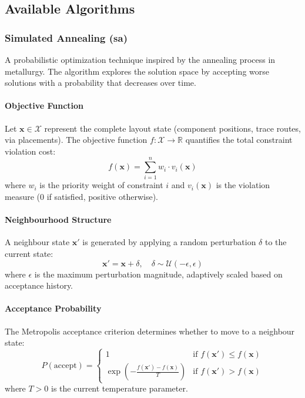 \subsection{Available Algorithms}

\subsubsection{Simulated Annealing (sa)}
A probabilistic optimization technique inspired by the annealing process in metallurgy. The algorithm explores the solution space by accepting worse solutions with a probability that decreases over time.

\paragraph{Objective Function}
Let $\mathbf{x} \in \mathcal{X}$ represent the complete layout state (component positions, trace routes, via placements). The objective function $f: \mathcal{X} \rightarrow \mathbb{R}$ quantifies the total constraint violation cost:
\begin{equation}
f(\mathbf{x}) = \sum_{i=1}^{n} w_i \cdot v_i(\mathbf{x})
\end{equation}
where $w_i$ is the priority weight of constraint $i$ and $v_i(\mathbf{x})$ is the violation measure (0 if satisfied, positive otherwise).

\paragraph{Neighbourhood Structure}
A neighbour state $\mathbf{x}'$ is generated by applying a random perturbation $\delta$ to the current state:
\begin{equation}
\mathbf{x}' = \mathbf{x} + \delta, \quad \delta \sim \mathcal{U}(-\epsilon, \epsilon)
\end{equation}
where $\epsilon$ is the maximum perturbation magnitude, adaptively scaled based on acceptance history.

\paragraph{Acceptance Probability}
The Metropolis acceptance criterion determines whether to move to a neighbour state:
\begin{equation}
P(\text{accept}) = \begin{cases}
1 & \text{if } f(\mathbf{x}') \leq f(\mathbf{x}) \\
\exp\left(-\frac{f(\mathbf{x}') - f(\mathbf{x})}{T}\right) & \text{if } f(\mathbf{x}') > f(\mathbf{x})
\end{cases}
\end{equation}
where $T > 0$ is the current temperature parameter.

